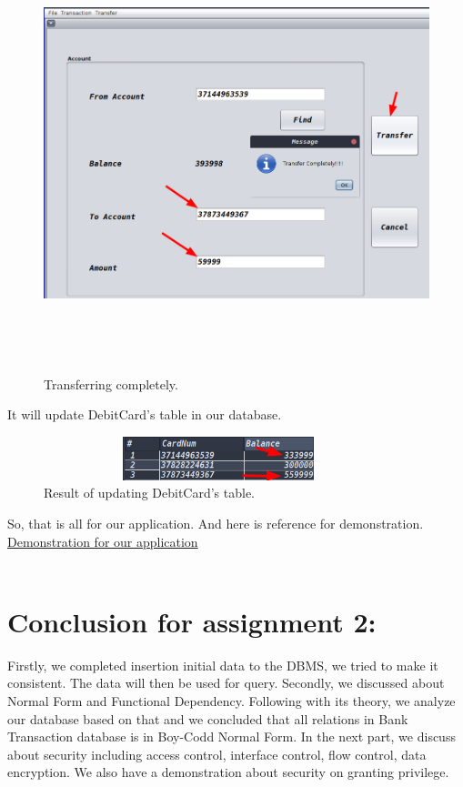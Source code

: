 \documentclass[12pt,a4paper]{article}
\begin{document}
\begin{figure}[H]
        \centering
        \includegraphics[width=5.5in,height=5in]{Picture/transfer.png}
        \caption{Transferring completely.}
\end{figure}

\indent It will update DebitCard's table in our database.

\begin{figure}[H]
        \centering
        \includegraphics[width=4in,height=0.5in]{Picture/resultTransfer.png}
        \caption{Result of updating DebitCard's table.}
\end{figure}
\indent So, that is all for our application. And here is reference for demonstration.
\href{https://drive.google.com/file/d/1-c-ld9rg3d1Jr9wX7pFM0SyzRZ1Sm9qZ/view?usp=sharing}{Demonstration for our application}\\\\
\indent 

\section{Conclusion for assignment 2: }
Firstly, we completed insertion initial data to the DBMS, we tried to make it consistent. The data will then be used for query. Secondly, we discussed about Normal Form and Functional Dependency. Following with its theory, we analyze our database based on that and we concluded that all relations in Bank Transaction database is in Boy-Codd Normal Form.
In the next part, we discuss about security including access control, interface control, flow control, data encryption. We also have a demonstration about security on granting privilege. 
\end{document}
